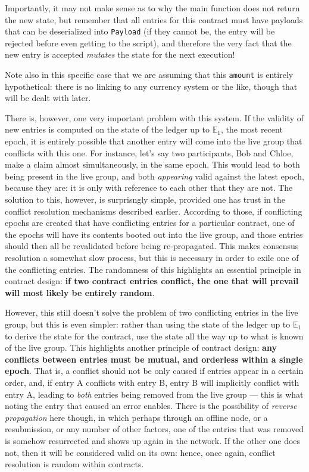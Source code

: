 \documentclass{extreport}
\begin{document}
Importantly, it may not make sense as to why the main function does not return the new state, but remember that all entries for this contract must have payloads that can be deserialized into \texttt{Payload} (if they cannot be, the entry will be rejected before even getting to the script), and therefore the very fact that the new entry is accepted \emph{mutates} the state for the next execution!

Note also in this specific case that we are assuming that this \texttt{amount} is entirely hypothetical: there is no linking to any currency system or the like, though that will be dealt with later.

There is, however, one very important problem with this system. If the validity of new entries is computed on the state of the ledger up to \(\mathbb{E}_1\), the most recent epoch, it is entirely possible that another entry will come into the live group that conflicts with this one. For instance, let's say two participants, Bob and Chloe, make a claim almost simultaneously, in the same epoch. This would lead to both being present in the live group, and both \emph{appearing} valid against the latest epoch, because they are: it is only with reference to each other that they are not. The solution to this, however, is surprisngly simple, provided one has trust in the conflict resolution mechanisms described earlier. According to those, if conflicting epochs are created that have conflicting entries for a particular contract, one of the epochs will have its contents booted out into the live group, and those entries should then all be revalidated before being re-propagated. This makes consensus resolution a somewhat slow process, but this is necessary in order to exile one of the conflicting entries. The randomness of this highlights an essential principle in contract design: \textbf{if two contract entries conflict, the one that will prevail will most likely be entirely random}.

However, this still doesn't solve the problem of two conflicting entries in the live group, but this is even simpler: rather than using the state of the ledger up to \(\mathbb{E}_1\) to derive the state for the contract, use the state all the way up to what is known of the live group. This highlights another principle of contract design: \textbf{any conflicts between entries must be mutual, and orderless within a single epoch}. That is, a conflict should not be only caused if entries appear in a certain order, and, if entry A conflicts with entry B, entry B will implicitly conflict with entry A, leading to \emph{both} entries being removed from the live group --- this is what noting the entry that caused an error enables. There is the possibility of \emph{reverse propagation} here though, in which perhaps through an offline node, or a resubmission, or any number of other factors, one of the entries that was removed is somehow resurrected and shows up again in the network. If the other one does not, then it will be considered valid on its own: hence, once again, conflict resolution is random within contracts.
\end{document}
